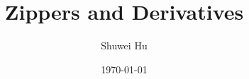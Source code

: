 \documentclass{beamer}
\title{Zippers and Derivatives}
\author{Shuwei Hu}
\date{\today}
\begin{document}
\frame{\titlepage}




\end{document}

